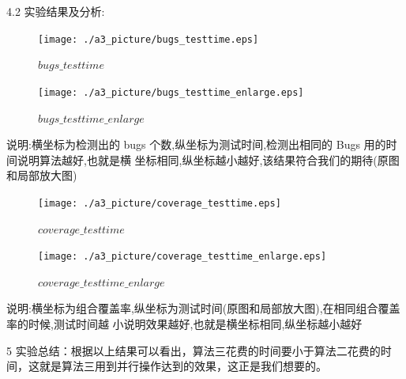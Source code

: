\documentclass[10pt,journal,letterpaper,compsoc]{IEEEtran}
\begin{document}
\begin{CJK}{UTF8}{gkai}
4.2 实验结果及分析:
 \begin{figure}[htb]
   \centering
   \texttt{[image: ./a3\_picture/bugs\_testtime.eps]}
   \caption{$bugs\_testtime$}
   \label{fig:ARCH}
 \end{figure}
 \begin{figure}[htb]
   \centering
   \texttt{[image: ./a3\_picture/bugs\_testtime\_enlarge.eps]}
   \caption{$bugs\_testtime\_enlarge$}
   \label{fig:ARCH}
 \end{figure}

说明:横坐标为检测出的 bugs 个数,纵坐标为测试时间,检测出相同的 Bugs 用的时间说明算法越好,也就是横
坐标相同,纵坐标越小越好,该结果符合我们的期待(原图和局部放大图)
 \begin{figure}[htb]
   \centering
   \texttt{[image: ./a3\_picture/coverage\_testtime.eps]}
   \caption{$coverage\_testtime$}
   \label{fig:ARCH}
 \end{figure}
 \begin{figure}[htb]
   \centering
   \texttt{[image: ./a3\_picture/coverage\_testtime\_enlarge.eps]}
   \caption{$coverage\_testtime\_enlarge$}
   \label{fig:ARCH}
 \end{figure}

说明:横坐标为组合覆盖率,纵坐标为测试时间(原图和局部放大图),在相同组合覆盖率的时候,测试时间越
小说明效果越好,也就是横坐标相同,纵坐标越小越好

5 实验总结：根据以上结果可以看出，算法三花费的时间要小于算法二花费的时间，这就是算法三用到并行操作达到的效果，这正是我们想要的。
\end{CJK}
\end{document}
